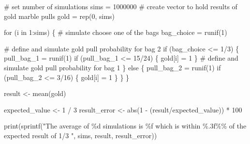 \documentclass[
  letterpaper,
  DIV=11,
  numbers=noendperiod]{scrartcl}
\newenvironment{Shaded}{\begin{snugshade}}{\end{snugshade}}
\newcommand{\CommentTok}[1]{\textcolor[rgb]{0.37,0.37,0.37}{#1}}
\newcommand{\ControlFlowTok}[1]{\textcolor[rgb]{0.00,0.23,0.31}{#1}}
\newcommand{\DecValTok}[1]{\textcolor[rgb]{0.68,0.00,0.00}{#1}}
\newcommand{\FunctionTok}[1]{\textcolor[rgb]{0.28,0.35,0.67}{#1}}
\newcommand{\NormalTok}[1]{\textcolor[rgb]{0.00,0.23,0.31}{#1}}
\newcommand{\OtherTok}[1]{\textcolor[rgb]{0.00,0.23,0.31}{#1}}
\newcommand{\SpecialCharTok}[1]{\textcolor[rgb]{0.37,0.37,0.37}{#1}}
\newcommand{\StringTok}[1]{\textcolor[rgb]{0.13,0.47,0.30}{#1}}
\begin{document}
\begin{Shaded}
\begin{Highlighting}[]
\CommentTok{\# set number of simulations}
\NormalTok{sims }\OtherTok{=} \DecValTok{1000000}
\CommentTok{\# create vector to hold results of gold marble pulls}
\NormalTok{gold }\OtherTok{=} \FunctionTok{rep}\NormalTok{(}\DecValTok{0}\NormalTok{, sims)}

\ControlFlowTok{for}\NormalTok{ (i }\ControlFlowTok{in} \DecValTok{1}\SpecialCharTok{:}\NormalTok{sims) \{}
    \CommentTok{\# simulate choose one of the bags}
\NormalTok{    bag\_choice }\OtherTok{=} \FunctionTok{runif}\NormalTok{(}\DecValTok{1}\NormalTok{)}

    \CommentTok{\# define and simulate gold pull probability for bag 2}
    \ControlFlowTok{if}\NormalTok{ (bag\_choice }\SpecialCharTok{\textless{}=} \DecValTok{1}\SpecialCharTok{/}\DecValTok{3}\NormalTok{) \{}
\NormalTok{        pull\_bag\_1 }\OtherTok{=} \FunctionTok{runif}\NormalTok{(}\DecValTok{1}\NormalTok{)}
        \ControlFlowTok{if}\NormalTok{ (pull\_bag\_1 }\SpecialCharTok{\textless{}=} \DecValTok{15}\SpecialCharTok{/}\DecValTok{24}\NormalTok{) \{}
\NormalTok{            gold[i] }\OtherTok{=} \DecValTok{1}
\NormalTok{        \}}
    \CommentTok{\# define and simulate gold pull probability for bag 1}
\NormalTok{    \} }\ControlFlowTok{else}\NormalTok{ \{}
\NormalTok{        pull\_bag\_2 }\OtherTok{=} \FunctionTok{runif}\NormalTok{(}\DecValTok{1}\NormalTok{)}
        \ControlFlowTok{if}\NormalTok{ (pull\_bag\_2 }\SpecialCharTok{\textless{}=} \DecValTok{3}\SpecialCharTok{/}\DecValTok{16}\NormalTok{) \{}
\NormalTok{            gold[i] }\OtherTok{=} \DecValTok{1}
\NormalTok{        \}}
\NormalTok{    \}}
\NormalTok{\}}

\NormalTok{result }\OtherTok{\textless{}{-}} \FunctionTok{mean}\NormalTok{(gold)}
\end{Highlighting}
\end{Shaded}

\begin{Shaded}
\begin{Highlighting}[]
\NormalTok{expected\_value }\OtherTok{\textless{}{-}} \DecValTok{1} \SpecialCharTok{/} \DecValTok{3}
\NormalTok{result\_error }\OtherTok{\textless{}{-}} \FunctionTok{abs}\NormalTok{(}\DecValTok{1} \SpecialCharTok{{-}}\NormalTok{ (result}\SpecialCharTok{/}\NormalTok{expected\_value)) }\SpecialCharTok{*} \DecValTok{100}

\FunctionTok{print}\NormalTok{(}\FunctionTok{sprintf}\NormalTok{(}\StringTok{"The average of \%d simulations is \%f which is within \%.3f\%\% of the expected result of 1/3 "}\NormalTok{, sims, result, result\_error))}
\end{Highlighting}
\end{Shaded}
\end{document}
